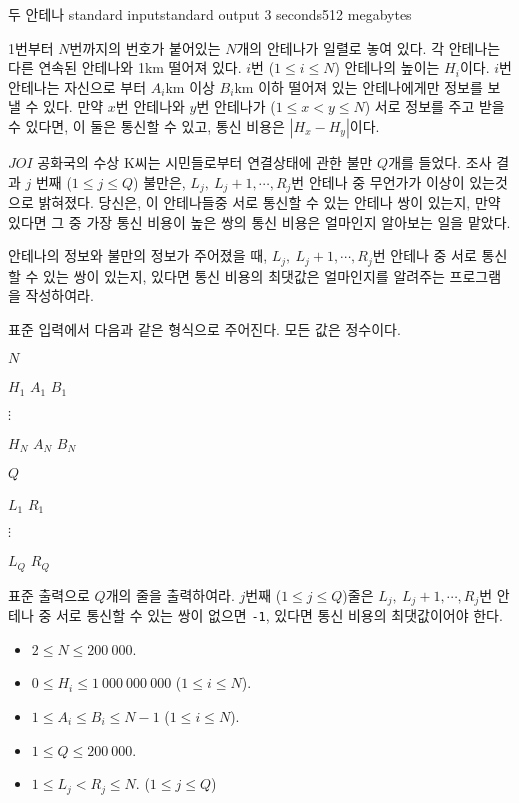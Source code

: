 \begin{problem}{두 안테나}
	{standard input}{standard output}
	{3 seconds}{512 megabytes}{}
	
	1번부터 $N$번까지의 번호가 붙어있는 $N$개의 안테나가 일렬로 놓여 있다. 각 안테나는 다른 연속된 안테나와 1km 떨어져 있다. $i$번 ($1 \le i \le N$) 안테나의 높이는 $H_i$이다. $i$번 안테나는 자신으로 부터 $A_i$km 이상 $B_i$km 이하 떨어져 있는 안테나에게만 정보를 보낼 수 있다. 만약 $x$번 안테나와 $y$번 안테나가 ($1 \le x < y \le N$) 서로 정보를 주고 받을 수 있다면, 이 둘은 통신할 수 있고, 통신 비용은 $|H_x - H_y|$이다.
	
	$JOI$ 공화국의 수상 K씨는 시민들로부터 연결상태에 관한 불만 $Q$개를 들었다. 조사 결과 $j$ 번째 ($1 \le j \le Q$) 불만은, $L_j, \ L_j +1, \cdots, R_j$번 안테나 중 무언가가 이상이 있는것으로 밝혀졌다. 당신은, 이 안테나들중 서로 통신할 수 있는 안테나 쌍이 있는지, 만약 있다면 그 중 가장 통신 비용이 높은 쌍의 통신 비용은 얼마인지 알아보는 일을 맡았다.
	
	안테나의 정보와 불만의 정보가 주어졌을 때, $L_j, \ L_j +1, \cdots, R_j$번 안테나 중 서로 통신할 수 있는 쌍이 있는지, 있다면 통신 비용의 최댓값은 얼마인지를 알려주는 프로그램을 작성하여라.
	
	\InputFile
	
	표준 입력에서 다음과 같은 형식으로 주어진다. 모든 값은 정수이다.

	$N$
	
	$H_1$ $A_1$ $B_1$
	
	$\vdots$
	
	$H_N$ $A_N$ $B_N$

	$Q$
	
	$L_1$ $R_1$
	
	$\vdots$
	
	$L_Q$ $R_Q$
	
	\OutputFile
	
	표준 출력으로 $Q$개의 줄을 출력하여라. $j$번째 ($1 \le j \le Q$)줄은 $L_j, \ L_j +1, \cdots, R_j$번 안테나 중 서로 통신할 수 있는 쌍이 없으면 \texttt{-1}, 있다면 통신 비용의 최댓값이어야 한다.
	
	\Constraints
	
	\begin{itemize}
	
	\item $2 \le N \le 200\ 000$.
	\item $0 \le H_i \le 1\ 000\ 000\ 000$ ($1 \le i \le N$).
	\item $1 \le A_i \le B_i \le N-1$ ($1 \le i \le N$).
	\item $1 \le Q \le 200\ 000$.
	\item $1 \le L_j < R_j \le N$. ($1 \le j \le Q$)
		

\end{itemize}
\end{problem}
